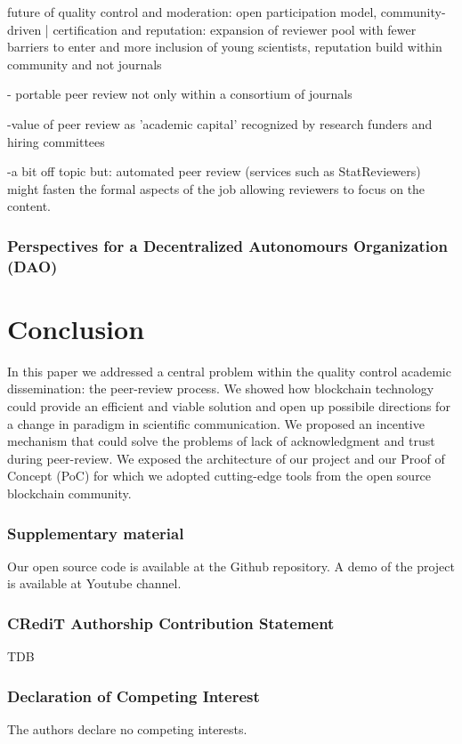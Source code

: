 \documentclass[runningheads]{llncs}
\begin{document}
future of quality control and moderation: open participation model, community-driven | certification and reputation: expansion of reviewer pool with fewer barriers to enter and more inclusion of young scientists, reputation build within community and not journals

- portable peer review not only within a consortium of journals

-value of peer review as 'academic capital' recognized by research funders and hiring committees

-a bit off topic but: automated peer review (services such as StatReviewers) might fasten the formal aspects of the job allowing reviewers to focus on the content.

\subsubsection{Perspectives for a Decentralized Autonomours Organization (DAO)}

\section{Conclusion}
In this paper we addressed a central problem within the quality control academic dissemination: the peer-review process. We showed how blockchain technology could provide an efficient and viable solution and open up possibile directions for a change in paradigm in scientific communication. We proposed an incentive mechanism that could solve the problems of lack of acknowledgment and trust during peer-review. We exposed the architecture of our project and our Proof of Concept (PoC) for which we adopted cutting-edge tools from the open source blockchain community.

\subsubsection{Supplementary material}
Our open source code is available at the Github repository. A demo of the project is available at Youtube channel.

\subsubsection{CRediT Authorship Contribution Statement}
TDB

\subsubsection{Declaration of Competing Interest}
The authors declare no competing interests.
\end{document}
